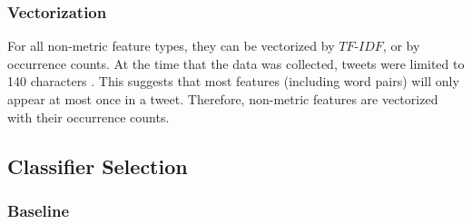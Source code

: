 \documentclass[11pt]{article}
\begin{document}


\subsubsection{Vectorization}

For all non-metric feature types, they can be vectorized by $TF$-$IDF$, or by occurrence counts.
At the time that the data was collected, tweets were limited to 140 characters \cite{tweetlen}.
This suggests that most features (including word pairs) will only appear at most once in a tweet.
Therefore, non-metric features are vectorized with their occurrence counts. 



\subsection{Classifier Selection}

\subsubsection{Baseline}
\end{document}

